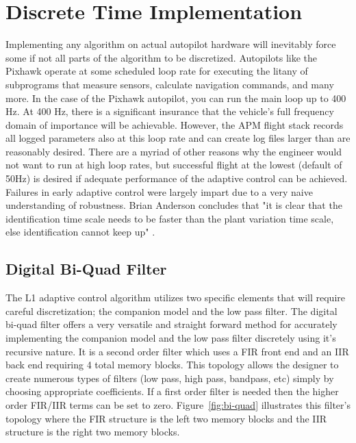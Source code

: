 \section{\Lone Discrete Time Implementation}
Implementing any algorithm on actual autopilot hardware will inevitably force some if not all parts of the algorithm to be discretized.  Autopilots like the Pixhawk operate at some scheduled loop rate for executing the litany of subprograms that measure sensors, calculate navigation commands, and many more.  In the case of the Pixhawk autopilot, you can run the main loop up to 400 Hz.  At 400 Hz, there is a significant insurance that the vehicle's full frequency domain of importance will be achievable.  However, the \ac{APM} flight stack records all logged parameters also at this loop rate and can create log files larger than are reasonably desired.  There are a myriad of other reasons why the engineer would not want to run at high loop rates, but successful flight at the lowest (default of 50Hz) is desired if adequate performance of the adaptive control can be achieved.  Failures in early adaptive control were largely impart due to a very naive understanding of robustness.  Brian Anderson concludes that "it is clear that the identification time scale needs to be faster than the plant variation time scale, else identification cannot keep up" \cite{anderson2005failures}.   

\subsection{Digital Bi-Quad Filter}

The L1 adaptive control algorithm utilizes two specific elements that will require careful discretization; the companion model and the low pass filter.  The digital bi-quad filter offers a very versatile and straight forward method for accurately implementing the companion model and the low pass filter discretely using it's recursive nature.  It is a second order filter which uses a \ac{FIR} front end and an \ac{IIR} back end requiring 4 total memory blocks.  This topology allows the designer to create numerous types of filters (low pass, high pass, bandpass, etc) simply by choosing appropriate coefficients.  If a first order filter is needed then the higher order FIR/IIR terms can be set to zero.  Figure~\ref{fig:bi-quad} illustrates this filter's topology where the \ac{FIR} structure is the left two memory blocks and the \ac{IIR} structure is the right two memory blocks.

